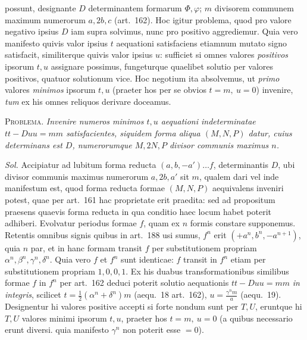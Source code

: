 possunt, designante \(D\) determinantem formarum \(\Phi,\varphi\); \(m\) divisorem communem maximum numerorum \(a,2b,c\) (art.~162). Hoc igitur problema, quod pro valore negativo ipsius \(D\) iam supra solvimus, nunc pro positivo aggrediemur. Quia vero manifesto quivis valor ipsius \(t\) aequationi satisfaciens etiamnum mutato signo satisfacit, similiterque quivis valor ipsius \(u\): sufficiet si omnes valores \textit{positivos} ipsorum \(t,u\) assignare possimus, fungeturque quaelibet solutio per valores positivos, quatuor solutionum vice. Hoc negotium ita absolvemus, ut \textit{primo} valores \textit{minimos} ipsorum \(t,u\) (praeter hos per se obvios \(t=m,\ u=0\)) invenire, \textit{tum} ex his omnes reliquos derivare doceamus.

\textsc{Problema.} \textit{Invenire numeros minimos \(t,u\) aequationi indeterminatae \(tt-Duu=mm\) satisfacientes, siquidem forma aliqua \((M,N,P)\) datur, cuius determinans est \(D\), numerorumque \(M,2N,P\) divisor communis maximus \(n\).}

\textit{Sol.} Accipiatur ad lubitum forma reducta \((a,b,-a')\ldots f\), determinantis \(D\), ubi divisor communis maximus numerorum \(a,2b,a'\) sit \(m\), qualem dari vel inde manifestum est, quod forma reducta formae \((M,N,P)\) aequivalens inveniri potest, quae per art.~161 hac proprietate erit praedita: sed ad propositum praesens quaevis forma reducta in qua conditio haec locum habet poterit adhiberi. Evolvatur periodus formae \(f\), quam ex \(n\) formis constare supponemus. Retentis omnibus signis quibus in art.~188 usi sumus, \(f^n\) erit \((+a^n,b^n,-a^{n+1})\), quia \(n\) par, et in hanc formam transit \(f\) per substitutionem propriam \(\alpha^n,\beta^n,\gamma^n,\delta^n\). Quia vero \(f\) et \(f^n\) sunt identicae: \(f\) transit in \(f^n\) etiam per substitutionem propriam \(1,0,0,1\). Ex his duabus transformationibus similibus formae \(f\) in \(f^n\) per art.~162 deduci poterit solutio aequationis \(tt-Duu=mm\) \textit{in integris}, scilicet \(t=\frac12(\alpha^n+\delta^n)m\) (aequ.~18 art.~162), \(u=\frac{\gamma^n m}{a}\) (aequ.~19). Designentur hi valores positive accepti si forte nondum sunt per \(T,U\), eruntque hi \(T,U\) valores minimi ipsorum \(t,u\), praeter hos \(t=m,\ u=0\) (a quibus necessario erunt diversi. quia manifesto \(\gamma^n\) non poterit esse \(=0\)).

